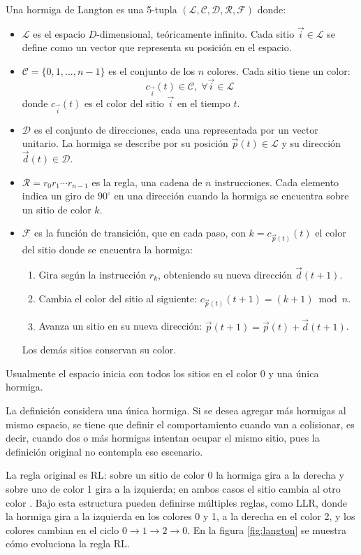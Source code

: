 \begin{definition}
	Una hormiga de Langton es una 5-tupla $(\mathcal{L}, \mathcal{C}, \mathcal{D}, \mathcal{R}, \mathcal{F})$ donde:
	\begin{itemize}
		\item $\mathcal{L}$ es el espacio $D$-dimensional, teóricamente infinito. Cada sitio $\vec{i} \in \mathcal{L}$ se define como un vector que representa su posición en el espacio.
		\item $\mathcal{C} = \{0, 1, \dots, n-1\}$ es el conjunto de los $n$ colores. Cada sitio tiene un color:
		\[
		c_{\vec{i}}(t) \in \mathcal{C},\; \forall \vec{i} \in \mathcal{L}
		\]
		donde $c_{\vec{i}}(t)$ es el color del sitio $\vec{i}$ en el tiempo $t$.
		\item $\mathcal{D}$ es el conjunto de direcciones, cada una representada por un vector unitario. La hormiga se describe por su posición $\vec{p}(t) \in \mathcal{L}$ y su dirección $\vec{d}(t) \in \mathcal{D}$.
		\item $\mathcal{R} = r_0 r_1 \cdots r_{n-1}$ es la regla, una cadena de $n$ instrucciones. Cada elemento indica un giro de $90^\circ$ en una dirección cuando la hormiga se encuentra sobre un sitio de color $k$.
		\item $\mathcal{F}$ es la función de transición, que en cada paso, con $k = c_{\vec{p}(t)}(t)$ el color del sitio donde se encuentra la hormiga:
		\begin{enumerate}
			\item Gira según la instrucción $r_k$, obteniendo su nueva dirección $\vec{d}(t+1)$.
			\item Cambia el color del sitio al siguiente: $c_{\vec{p}(t)}(t+1) = (k + 1) \bmod n$.
			\item Avanza un sitio en su nueva dirección: $\vec{p}(t+1) = \vec{p}(t) + \vec{d}(t+1)$.
		\end{enumerate}
		Los demás sitios conservan su color.
	\end{itemize}
	Usualmente el espacio inicia con todos los sitios en el color 0 y una única hormiga.
\end{definition}

La definición considera una única hormiga. Si se desea agregar más hormigas al mismo espacio, se tiene que definir el comportamiento cuando van a colisionar, es decir, cuando dos o más hormigas intentan ocupar el mismo sitio, pues la definición original no contempla ese escenario.

La regla original es RL: sobre un sitio de color 0 la hormiga gira a la derecha y sobre uno de color 1 gira a la izquierda; en ambos casos el sitio cambia al otro color \cite{freire2024_langton}. Bajo esta estructura pueden definirse múltiples reglas, como LLR, donde la hormiga gira a la izquierda en los colores 0 y 1, a la derecha en el color 2, y los colores cambian en el ciclo $0 \rightarrow 1 \rightarrow 2 \rightarrow 0$. En la figura \ref{fig:langton} se muestra cómo evoluciona la regla RL.


